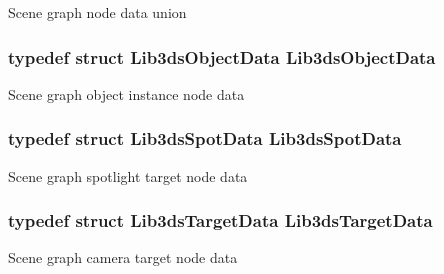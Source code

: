 Scene graph node data union \hypertarget{group__node_ga85a4ac26f142af0fcb16d6848076c3c1}{
\subsubsection[{Lib3ds\-Object\-Data}]{\setlength{\rightskip}{0pt plus 5cm}typedef {\bf struct} {\bf Lib3ds\-Object\-Data}  {\bf Lib3ds\-Object\-Data}}}\label{group__node_ga85a4ac26f142af0fcb16d6848076c3c1}
Scene graph object instance node data \hypertarget{group__node_ga8d907993bc5aa338f5d85c0495e867c8}{
\subsubsection[{Lib3ds\-Spot\-Data}]{\setlength{\rightskip}{0pt plus 5cm}typedef {\bf struct} {\bf Lib3ds\-Spot\-Data}  {\bf Lib3ds\-Spot\-Data}}}\label{group__node_ga8d907993bc5aa338f5d85c0495e867c8}
Scene graph spotlight target node data \hypertarget{group__node_ga153f5447adef21a31250d5074635a14a}{
\subsubsection[{Lib3ds\-Target\-Data}]{\setlength{\rightskip}{0pt plus 5cm}typedef {\bf struct} {\bf Lib3ds\-Target\-Data}  {\bf Lib3ds\-Target\-Data}}}\label{group__node_ga153f5447adef21a31250d5074635a14a}
Scene graph camera target node data 

